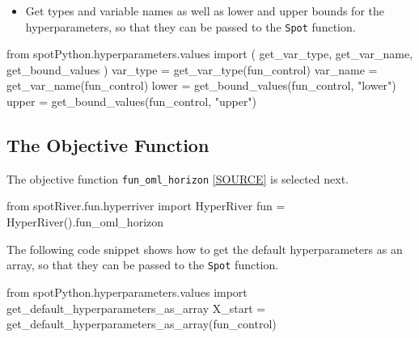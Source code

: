 \documentclass[
  letterpaper,
  DIV=11,
  numbers=noendperiod]{scrreprt}
\newenvironment{Shaded}{\begin{snugshade}}{\end{snugshade}}
\newcommand{\ImportTok}[1]{\textcolor[rgb]{0.00,0.46,0.62}{#1}}
\newcommand{\NormalTok}[1]{\textcolor[rgb]{0.00,0.23,0.31}{#1}}
\newcommand{\OperatorTok}[1]{\textcolor[rgb]{0.37,0.37,0.37}{#1}}
\newcommand{\StringTok}[1]{\textcolor[rgb]{0.13,0.47,0.30}{#1}}
\providecommand{\tightlist}{%
  \setlength{\itemsep}{0pt}\setlength{\parskip}{0pt}}\usepackage{longtable,booktabs,array}
\begin{document}
\begin{itemize}
\tightlist
\item
  Get types and variable names as well as lower and upper bounds for the
  hyperparameters, so that they can be passed to the \texttt{Spot}
  function.
\end{itemize}

\begin{Shaded}
\begin{Highlighting}[]
\ImportTok{from}\NormalTok{ spotPython.hyperparameters.values }\ImportTok{import}\NormalTok{ (}
\NormalTok{    get\_var\_type,}
\NormalTok{    get\_var\_name,}
\NormalTok{    get\_bound\_values    }
\NormalTok{    )}
\NormalTok{var\_type }\OperatorTok{=}\NormalTok{ get\_var\_type(fun\_control)}
\NormalTok{var\_name }\OperatorTok{=}\NormalTok{ get\_var\_name(fun\_control)}
\NormalTok{lower }\OperatorTok{=}\NormalTok{ get\_bound\_values(fun\_control, }\StringTok{"lower"}\NormalTok{)}
\NormalTok{upper }\OperatorTok{=}\NormalTok{ get\_bound\_values(fun\_control, }\StringTok{"upper"}\NormalTok{)}
\end{Highlighting}
\end{Shaded}

\hypertarget{sec-the-objective-function-10}{%
\subsection{The Objective
Function}\label{sec-the-objective-function-10}}

The objective function \texttt{fun\_oml\_horizon}
\href{https://github.com/sequential-parameter-optimization/spotRiver/blob/main/src/spotRiver/fun/hyperriver.py}{{[}SOURCE{]}}
is selected next.

\begin{Shaded}
\begin{Highlighting}[]
\ImportTok{from}\NormalTok{ spotRiver.fun.hyperriver }\ImportTok{import}\NormalTok{ HyperRiver}
\NormalTok{fun }\OperatorTok{=}\NormalTok{ HyperRiver().fun\_oml\_horizon}
\end{Highlighting}
\end{Shaded}

The following code snippet shows how to get the default hyperparameters
as an array, so that they can be passed to the \texttt{Spot} function.

\begin{Shaded}
\begin{Highlighting}[]
\ImportTok{from}\NormalTok{ spotPython.hyperparameters.values }\ImportTok{import}\NormalTok{ get\_default\_hyperparameters\_as\_array}
\NormalTok{X\_start }\OperatorTok{=}\NormalTok{ get\_default\_hyperparameters\_as\_array(fun\_control)}
\end{Highlighting}
\end{Shaded}
\end{document}
